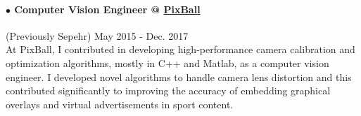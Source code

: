 \documentclass[10pt]{res}
\begin{document}
\begin{resume}
\paragraph{$\bullet$ Computer Vision Engineer @ \href{http://pixballsports.com}{PixBall}} (Previously Sepehr) \hfill May 2015 - Dec. 2017\\
At PixBall, I contributed in developing high-performance camera calibration and optimization algorithms, mostly in C++ and Matlab, as a computer vision engineer.
I developed novel algorithms to handle camera lens distortion and this contributed significantly to improving the accuracy of embedding graphical overlays and virtual advertisements in sport content.
\vspace{-6pt}





\end{resume}
\end{document}
